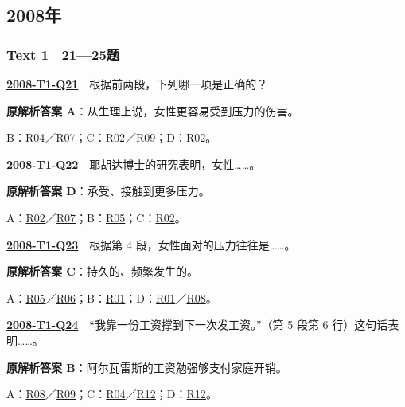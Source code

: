 \documentclass[11pt,a4paper]{article}
\begin{document}
\subsection{2008年}\label{year-2008}
\subsubsection{Text 1　21—25题}
\label{idx-2008-T1-Q21}\noindent\textbf{\href{https://zj139.github.io/math-notes/english/c0860baac11c5ef23be4bfac/\#q21}{2008-T1-Q21}}　根据前两段，下列哪一项是正确的？\par\nopagebreak
\noindent\textbf{原解析答案 A}：从生理上说，女性更容易受到压力的伤害。\par\nopagebreak
\noindent B：\hyperref[cat-R04]{R04}／\hyperref[cat-R07]{R07}；C：\hyperref[cat-R02]{R02}／\hyperref[cat-R09]{R09}；D：\hyperref[cat-R02]{R02}。\par\smallskip
{}\label{idx-2008-T1-Q22}\noindent\textbf{\href{https://zj139.github.io/math-notes/english/c0860baac11c5ef23be4bfac/\#q22}{2008-T1-Q22}}　耶胡达博士的研究表明，女性……。\par\nopagebreak
\noindent\textbf{原解析答案 D}：承受、接触到更多压力。\par\nopagebreak
\noindent A：\hyperref[cat-R02]{R02}／\hyperref[cat-R07]{R07}；B：\hyperref[cat-R05]{R05}；C：\hyperref[cat-R02]{R02}。\par\smallskip
{}\label{idx-2008-T1-Q23}\noindent\textbf{\href{https://zj139.github.io/math-notes/english/c0860baac11c5ef23be4bfac/\#q23}{2008-T1-Q23}}　根据第 4 段，女性面对的压力往往是……。\par\nopagebreak
\noindent\textbf{原解析答案 C}：持久的、频繁发生的。\par\nopagebreak
\noindent A：\hyperref[cat-R05]{R05}／\hyperref[cat-R06]{R06}；B：\hyperref[cat-R01]{R01}；D：\hyperref[cat-R01]{R01}／\hyperref[cat-R08]{R08}。\par\smallskip
{}\label{idx-2008-T1-Q24}\noindent\textbf{\href{https://zj139.github.io/math-notes/english/c0860baac11c5ef23be4bfac/\#q24}{2008-T1-Q24}}　“我靠一份工资撑到下一次发工资。”（第 5 段第 6 行）这句话表明……。\par\nopagebreak
\noindent\textbf{原解析答案 B}：阿尔瓦雷斯的工资勉强够支付家庭开销。\par\nopagebreak
\noindent A：\hyperref[cat-R08]{R08}／\hyperref[cat-R09]{R09}；C：\hyperref[cat-R04]{R04}／\hyperref[cat-R12]{R12}；D：\hyperref[cat-R12]{R12}。\par\smallskip
\end{document}
